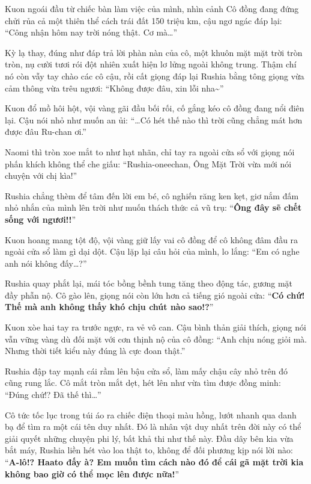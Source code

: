 \documentclass[../main.tex]{subfiles}
\begin{document}
Kuon ngoái đầu từ chiếc bàn làm việc của mình, nhìn cảnh Cô đồng đang đứng chửi rủa cả một thiên thể cách trái đất 150 triệu km, cậu ngơ ngác đáp lại: ``Công nhận hôm nay trời nóng thật. Cơ mà\dots''

Kỳ lạ thay, đúng như đáp trả lời phàn nàn của cô, một khuôn mặt mặt trời tròn tròn, nụ cười tươi rói đột nhiên xuất hiện lơ lửng ngoài không trung. Thậm chí nó còn vẫy tay chào các cô cậu, rồi cất giọng đáp lại Rushia bằng tông giọng vừa cảm thông vừa trêu ngươi: ``Không được đâu, xin lỗi nha\~{}''


Kuon đổ mồ hôi hột, vội vàng gãi đầu bối rối, cố gắng kéo cô đồng đang nổi điên lại. Cậu nói nhỏ như muốn an ủi: ``\dots Có hét thế nào thì trời cũng chẳng mát hơn được đâu Ru-chan ơi.''

Naomi thì tròn xoe mắt to như hạt nhãn, chỉ tay ra ngoài cửa sổ với giọng nói phấn khích không thể che giấu: ``Rushia-oneechan, Ông Mặt Trời vừa mới nói chuyện với chị kìa!''

Rushia chẳng thèm để tâm đến lời em bé, cô nghiến răng ken kẹt, giơ nắm đấm nhỏ nhắn của mình lên trời như muốn thách thức cả vũ trụ: ``\textbf{Ông đây sẽ chết sống với ngươi!!}''

Kuon hoang mang tột độ, vội vàng giữ lấy vai cô đồng để cô không đâm đầu ra ngoài cửa sổ làm gì dại dột. Cậu lặp lại câu hỏi của mình, lo lắng: ``Em có nghe anh nói không đấy\dots?''

Rushia quay phắt lại, mái tóc bồng bềnh tung tăng theo động tác, gương mặt đầy phẫn nộ. Cô gào lên, giọng nói còn lớn hơn cả tiếng gió ngoài cửa: ``\textbf{Có chứ! Thế mà anh không thấy khó chịu chút nào sao!?}''

Kuon xòe hai tay ra trước ngực, ra vẻ vô can. Cậu bình thản giải thích, giọng nói vẫn vững vàng dù đối mặt với cơn thịnh nộ của cô đồng: ``Anh chịu nóng giỏi mà. Nhưng thời tiết kiểu này đúng là cực đoan thật.''

Rushia đập tay mạnh cái rầm lên bậu cửa sổ, làm mấy chậu cây nhỏ trên đó cũng rung lắc. Cô mắt tròn mắt dẹt, hét lên như vừa tìm được đồng minh: ``Đúng chứ!? Đã thế thì\dots''

Cô tức tốc lục trong túi áo ra chiếc điện thoại màu hồng, lướt nhanh qua danh bạ để tìm ra một cái tên duy nhất. Đó là nhân vật duy nhất trên đời này có thể giải quyết những chuyện phi lý, bất khả thi như thế này. Đầu dây bên kia vừa bắt máy, Rushia liền hét vào loa thật to, không để đối phương kịp nói lời nào: ``\textbf{A-lô!? Haato đấy à? Em muốn tìm cách nào đó để cái gã mặt trời kia không bao giờ có thể mọc lên được nữa!}''
\end{document}
